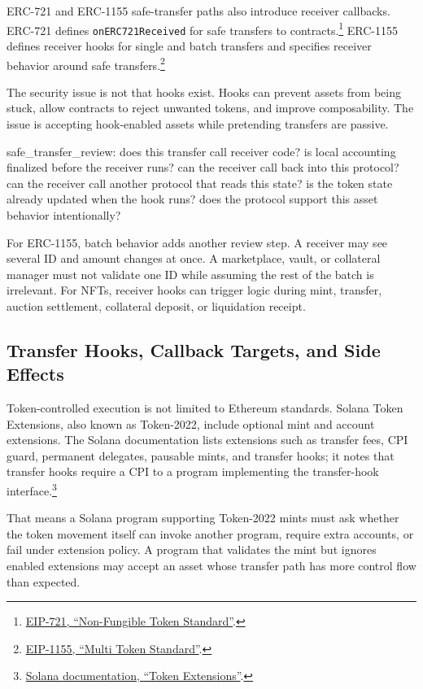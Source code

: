 ERC-721 and ERC-1155 safe-transfer paths also introduce receiver callbacks. ERC-721 defines \texttt{onERC721Received} for safe transfers to contracts.\footnote{\href{https://eips.ethereum.org/EIPS/eip-721}{EIP-721, ``Non-Fungible Token Standard''}.} ERC-1155 defines receiver hooks for single and batch transfers and specifies receiver behavior around safe transfers.\footnote{\href{https://eips.ethereum.org/EIPS/eip-1155}{EIP-1155, ``Multi Token Standard''}.}

The security issue is not that hooks exist. Hooks can prevent assets from being stuck, allow contracts to reject unwanted tokens, and improve composability. The issue is accepting hook-enabled assets while pretending transfers are passive.

\begin{codeblock}
safe_transfer_review:
    does this transfer call receiver code?
    is local accounting finalized before the receiver runs?
    can the receiver call back into this protocol?
    can the receiver call another protocol that reads this state?
    is the token state already updated when the hook runs?
    does the protocol support this asset behavior intentionally?
\end{codeblock}

For ERC-1155, batch behavior adds another review step. A receiver may see several ID and amount changes at once. A marketplace, vault, or collateral manager must not validate one ID while assuming the rest of the batch is irrelevant. For NFTs, receiver hooks can trigger logic during mint, transfer, auction settlement, collateral deposit, or liquidation receipt.

\subsection{Transfer Hooks, Callback Targets, and Side Effects}

Token-controlled execution is not limited to Ethereum standards. Solana Token Extensions, also known as Token-2022, include optional mint and account extensions. The Solana documentation lists extensions such as transfer fees, CPI guard, permanent delegates, pausable mints, and transfer hooks; it notes that transfer hooks require a CPI to a program implementing the transfer-hook interface.\footnote{\href{https://solana.com/docs/tokens/extensions}{Solana documentation, ``Token Extensions''}.}

That means a Solana program supporting Token-2022 mints must ask whether the token movement itself can invoke another program, require extra accounts, or fail under extension policy. A program that validates the mint but ignores enabled extensions may accept an asset whose transfer path has more control flow than expected.

